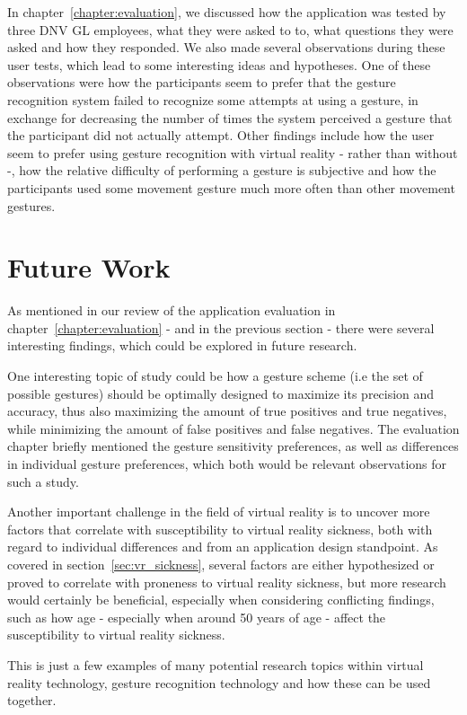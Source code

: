 In chapter~\ref{chapter:evaluation}, we discussed how the application was tested by three DNV GL employees, what they were asked to to, what questions they 
were asked and how they responded. We also made several observations during these user tests, which lead to some interesting ideas and hypotheses. 
One of these observations were how the participants seem to prefer that the gesture recognition system failed to recognize some attempts at using a gesture,
in exchange for decreasing the number of times the system perceived a gesture that the participant did not actually attempt. 
Other findings include how the user seem to prefer using gesture recognition with virtual reality - rather than without -, how the relative difficulty of performing 
a gesture is subjective and how the participants used some movement gesture much more often than other movement gestures.

\section{Future Work}
As mentioned in our review of the application evaluation in chapter~\ref{chapter:evaluation} - and in the previous section - there were several interesting findings, %
which could be explored in future research. 

One interesting topic of study could be how a gesture scheme (i.e the set of possible gestures) should be optimally designed to maximize its precision 
and accuracy, thus also maximizing the amount of true positives and true negatives, while minimizing the amount of false positives and false negatives. 
The evaluation chapter briefly mentioned the gesture sensitivity preferences, as well as differences in individual gesture preferences, which both
would be relevant observations for such a study.

Another important challenge in the field of virtual reality is to uncover more factors that correlate with susceptibility to virtual reality sickness, 
both with regard to individual differences and from an application design standpoint. As covered in section~\vref{sec:vr_sickness}, several factors are either hypothesized or 
proved to correlate with proneness to virtual reality sickness, but more research would certainly be beneficial, especially when considering conflicting findings, such as 
how age - especially when around 50 years of age - affect the susceptibility to virtual reality sickness.  

This is just a few examples of many potential research topics within virtual reality technology, gesture recognition technology and how these can be used together.


